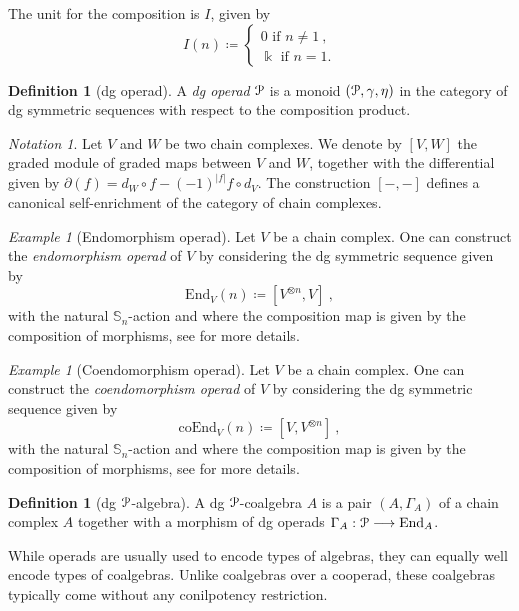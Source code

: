 \documentclass[a4paper,12pt]{amsart}
\renewcommand{\mathcal}{\EuScript}
\newcommand{\oneop}{\mathcal{P}}
\theoremstyle{plain}
\theoremstyle{definition}
\newtheorem{definition}[theorem]{Definition}%
\theoremstyle{remark}
\newtheorem{notation}[theorem]{\sc Notation}%
\newtheorem{example}[theorem]{\sc Example}%
\newcommand{\kk}{\Bbbk}
\begin{document}
The unit for the composition is $ I$, given by 
$$
I (n) \coloneqq
\begin{cases}
    0 \text{ if }n \neq 1~,
    \\
    \kk \text{ if }n = 1.
\end{cases}
$$


\begin{definition}[dg operad]
A \textit{dg operad} $\oneop$ is a monoid $(\oneop,\gamma,\eta)$ in the category of dg symmetric sequences with respect to the composition product. 
\end{definition}

\begin{notation}
Let $V$ and $W$ be two chain complexes. We denote by $[V,W]$ the graded module of graded maps between $V$ and $W$, together with the differential given by $\partial(f)= d_W \circ f -(-1)^{|f|}f \circ d_V$. The construction $[-,-]$ defines a canonical self-enrichment of the category of  chain complexes.
\end{notation}

\begin{example}[Endomorphism operad] 
Let $V$ be a chain complex. One can construct the \textit{endomorphism operad} of $V$ by considering the dg symmetric sequence given by 
\[
\mathrm{End}_V(n) \coloneqq [V^{\otimes n}, V]~, 
\] 
with the natural $\mathbb{S}_n$-action and where the composition map is given by the composition of morphisms, see \cite[Chapter 5]{LodayVallette} for more details.
\end{example}

\begin{example}[Coendomorphism operad] 
Let $V$ be a chain complex. One can construct the \textit{coendomorphism operad} of $V$ by considering the dg symmetric sequence given by 
\[
\mathrm{coEnd}_V(n) \coloneqq [V, V^{\otimes n}]~, 
\] 
with the natural $\mathbb{S}_n$-action and where the composition map is given by the composition of morphisms, see \cite[Chapter 5]{LodayVallette} for more details.
\end{example}

\begin{definition}[dg $\oneop$-algebra]
A dg $\oneop$-coalgebra $A$ is a pair $(A,\Gamma_A)$ of a chain complex $A$ together with a morphism of dg operads $\Gamma_A: \oneop \longrightarrow \mathrm{End}_A$. 
\end{definition}

While operads are usually used to encode types of algebras, they can equally well encode types of coalgebras. Unlike coalgebras over a cooperad, these coalgebras typically come without any conilpotency restriction.
\end{document}
